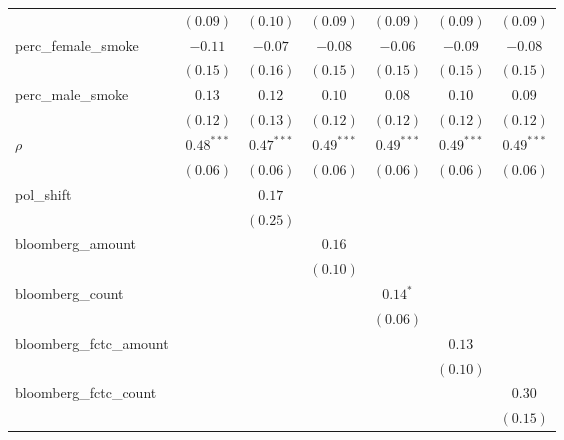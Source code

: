 \begin{table}[!h]
\begin{center}
\begin{tabular}{l c c c c c c }
                        & $(0.09)$     & $(0.10)$     & $(0.09)$     & $(0.09)$     & $(0.09)$     & $(0.09)$     \\
perc\_female\_smoke     & $-0.11$      & $-0.07$      & $-0.08$      & $-0.06$      & $-0.09$      & $-0.08$      \\
                        & $(0.15)$     & $(0.16)$     & $(0.15)$     & $(0.15)$     & $(0.15)$     & $(0.15)$     \\
perc\_male\_smoke       & $0.13$       & $0.12$       & $0.10$       & $0.08$       & $0.10$       & $0.09$       \\
                        & $(0.12)$     & $(0.13)$     & $(0.12)$     & $(0.12)$     & $(0.12)$     & $(0.12)$     \\
$\rho$                  & $0.48^{***}$ & $0.47^{***}$ & $0.49^{***}$ & $0.49^{***}$ & $0.49^{***}$ & $0.49^{***}$ \\
                        & $(0.06)$     & $(0.06)$     & $(0.06)$     & $(0.06)$     & $(0.06)$     & $(0.06)$     \\
pol\_shift              &              & $0.17$       &              &              &              &              \\
                        &              & $(0.25)$     &              &              &              &              \\
bloomberg\_amount       &              &              & $0.16$       &              &              &              \\
                        &              &              & $(0.10)$     &              &              &              \\
bloomberg\_count        &              &              &              & $0.14^{*}$   &              &              \\
                        &              &              &              & $(0.06)$     &              &              \\
bloomberg\_fctc\_amount &              &              &              &              & $0.13$       &              \\
                        &              &              &              &              & $(0.10)$     &              \\
bloomberg\_fctc\_count  &              &              &              &              &              & $0.30$       \\
                        &              &              &              &              &              & $(0.15)$     \\

\end{tabular}
\end{center}
\end{table}
